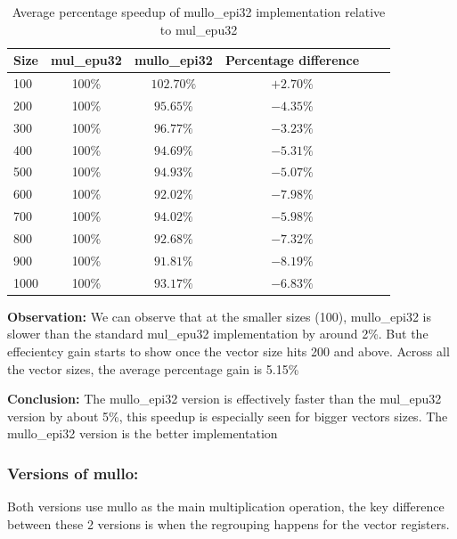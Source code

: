 \documentclass{article}
\begin{document}
\begin{table}[H]
    \centering
    \caption{Average percentage speedup of mullo\_epi32 implementation relative to mul\_epu32}
    \begin{tabular}{|l|c|c|c|c|c|}
        \hline
        Size & mul\_epu32 & mullo\_epi32 & Percentage difference \\ \hline
        100  & 100\%      & $102.70\%$   & $+2.70\%$             \\
        200  & 100\%      & $95.65\%$    & $-4.35\%$             \\
        300  & 100\%      & $96.77\%$    & $-3.23\%$             \\
        400  & 100\%      & $94.69\%$    & $-5.31\%$             \\
        500  & 100\%      & $94.93\%$    & $-5.07\%$             \\
        600  & 100\%      & $92.02\%$    & $-7.98\%$             \\
        700  & 100\%      & $94.02\%$    & $-5.98\%$             \\
        800  & 100\%      & $92.68\%$    & $-7.32\%$             \\
        900  & 100\%      & $91.81\%$    & $-8.19\%$             \\
        1000 & 100\%      & $93.17\%$    & $-6.83\%$             \\
        \hline
    \end{tabular}
\end{table}

\textbf{Observation:} We can observe that at the smaller sizes (100), mullo\_epi32 is slower than the standard mul\_epu32
implementation by around 2\%. But the effecientcy gain starts to show once the vector size hits 200 and above.
Across all the vector sizes, the average percentage gain is 5.15\%

\textbf{Conclusion:} The mullo\_epi32 version is effectively faster than the mul\_epu32 version by about 5\%, this speedup is especially seen for bigger vectors sizes.
The mullo\_epi32 version is the better implementation 

\subsubsection{Versions of mullo:}
Both versions use mullo as the main multiplication operation, the key difference between these 2 versions
is when the regrouping happens for the vector registers.
\end{document}
